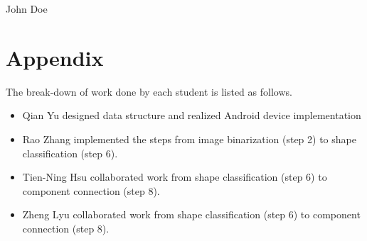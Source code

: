 \documentclass[conference,twocolumn]{IEEEtran}
\begin{document}
\begin{IEEEbiography}{John Doe}
\blindtext
\end{IEEEbiography}




\section{Appendix}
The break-down of work done by each student is listed as follows.
\begin{itemize}
    \item Qian Yu designed data structure and realized Android device implementation
    \item Rao Zhang implemented the steps from image binarization (step 2) to shape classification (step 6).
    \item Tien-Ning Hsu collaborated work from shape classification (step 6) to component connection (step 8).
    \item Zheng Lyu collaborated work from shape classification (step 6) to component connection (step 8).
\end{itemize}



\end{document}
